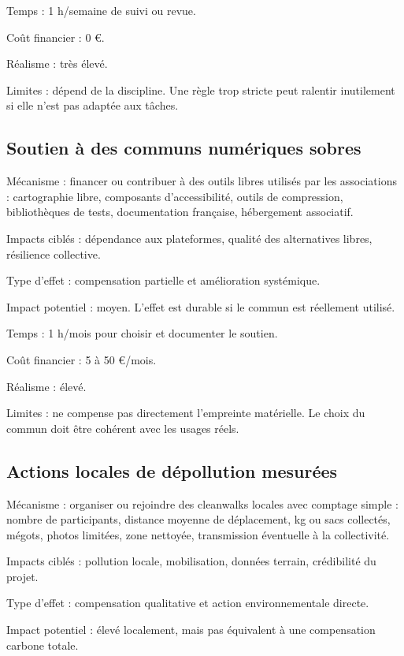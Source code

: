 \documentclass[
  10pt,
  a4paper,
  DIV=11,
  numbers=noendperiod,
  oneside]{scrreprt}
\begin{document}
Temps : 1 h/semaine de suivi ou revue.

Coût financier : 0 €.

Réalisme : très élevé.

Limites : dépend de la discipline. Une règle trop stricte peut ralentir
inutilement si elle n'est pas adaptée aux tâches.

\subsection{Soutien à des communs numériques
sobres}\label{soutien-uxe0-des-communs-numuxe9riques-sobres}

Mécanisme : financer ou contribuer à des outils libres utilisés par les
associations : cartographie libre, composants d'accessibilité, outils de
compression, bibliothèques de tests, documentation française,
hébergement associatif.

Impacts ciblés : dépendance aux plateformes, qualité des alternatives
libres, résilience collective.

Type d'effet : compensation partielle et amélioration systémique.

Impact potentiel : moyen. L'effet est durable si le commun est
réellement utilisé.

Temps : 1 h/mois pour choisir et documenter le soutien.

Coût financier : 5 à 50 €/mois.

Réalisme : élevé.

Limites : ne compense pas directement l'empreinte matérielle. Le choix
du commun doit être cohérent avec les usages réels.

\subsection{Actions locales de dépollution
mesurées}\label{actions-locales-de-duxe9pollution-mesuruxe9es}

Mécanisme : organiser ou rejoindre des cleanwalks locales avec comptage
simple : nombre de participants, distance moyenne de déplacement, kg ou
sacs collectés, mégots, photos limitées, zone nettoyée, transmission
éventuelle à la collectivité.

Impacts ciblés : pollution locale, mobilisation, données terrain,
crédibilité du projet.

Type d'effet : compensation qualitative et action environnementale
directe.

Impact potentiel : élevé localement, mais pas équivalent à une
compensation carbone totale.
\end{document}
